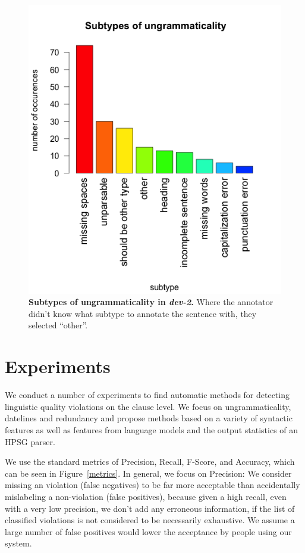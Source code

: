 \documentclass[a4paper,10pt]{scrartcl}
\theoremstyle{style}
\begin{document}
\begin{figure}
\begin{center}
\includegraphics[scale=0.6]{subtypes_dev2.png}
\end{center}
\caption{\textbf{Subtypes of ungrammaticality in \textit{dev-2}.} Where the annotator didn't know what subtype to annotate the sentence with, they selected ``other''.}
\label{subtypes}
\end{figure}

\newpage
\section{Experiments}
\label{experiments}
We conduct a number of experiments to find automatic methods for detecting linguistic quality violations on the clause level. We focus on ungrammaticality, datelines and redundancy and propose methods based on a variety of syntactic features as well as features from language models and the output statistics of an HPSG parser.

We use the standard metrics of Precision, Recall, F-Score, and Accuracy, which can be seen in Figure~\ref{metrics}. In general, we focus on Precision: We consider missing an violation (false negatives) to be far more acceptable than accidentally mislabeling a non-violation (false positives), because given a high recall, even with a very low precision, we don't add any erroneous information, if the list of classified violations is not considered to be necessarily exhaustive. We assume a large number of false positives would lower the acceptance by people using our system.
\end{document}

